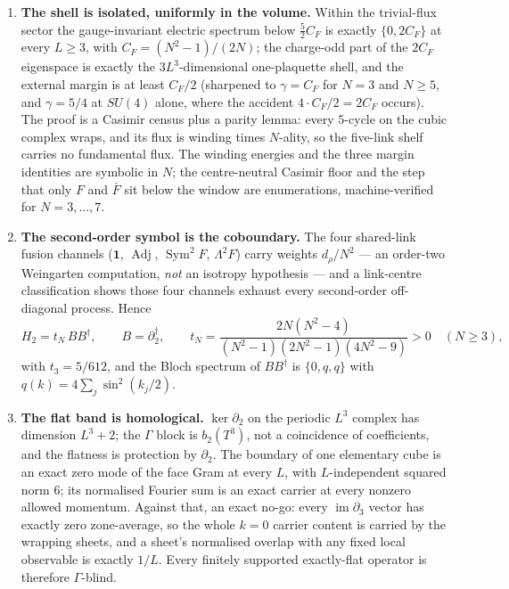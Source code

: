 \documentclass[11pt]{article}
\theoremstyle{definition}
\theoremstyle{remark}
\DeclareMathOperator{\adj}{Adj}
\DeclareMathOperator{\Sym}{Sym}
\newcommand{\CF}{C_F}
\newcommand{\dg}{^{\dagger}}
\newcommand{\chk}[1]{}
\begin{document}
\begin{enumerate}\itemsep3pt
\item \textbf{The shell is isolated, uniformly in the volume.} Within the
  trivial-flux sector the gauge-invariant electric spectrum below
  $\tfrac52\CF$ is exactly $\{0,2\CF\}$ at every $L\ge3$, with
  $\CF=(N^2-1)/(2N)$; the charge-odd part of the $2\CF$ eigenspace is exactly
  the $3L^3$-dimensional one-plaquette shell, and the external margin is at
  least $\CF/2$ (sharpened to $\gamma=\CF$ for $N=3$ and $N\ge5$, and
  $\gamma=5/4$ at $SU(4)$ alone, where the accident $4\cdot\CF/2=2\CF$ occurs).
  The proof is a Casimir census plus a parity lemma: every $5$-cycle on the
  cubic complex wraps, and its flux is winding times $N$-ality, so the
  five-link shelf carries no fundamental flux. The winding energies and the
  three margin identities are symbolic in $N$; the centre-neutral Casimir floor
  and the step that only $F$ and $\bar F$ sit below the window are enumerations,
  machine-verified for $N=3,\dots,7$.\chk{below 5 C\_F/2 the trivial-flux electric spectrum is exactly 0 and 2 C\_F}
\item \textbf{The second-order symbol is the coboundary.} The four shared-link
  fusion channels ($\mathbf1$, $\adj$, $\Sym^2F$, $\Lambda^2F$) carry weights
  $d_\rho/N^2$ --- an order-two Weingarten computation, \emph{not} an isotropy
  hypothesis --- and a link-centre classification shows those four channels
  exhaust every second-order off-diagonal process. Hence
  \begin{equation}\label{eq:t}
    H_2=t_N\,BB\dg,\qquad B=\partial_2\dg,\qquad
    t_N=\frac{2N(N^2-4)}{(N^2-1)(2N^2-1)(4N^2-9)}>0\quad(N\ge3),
  \end{equation}
  with $t_3=5/612$, and the Bloch spectrum of $BB\dg$ is $\{0,q,q\}$ with
  $q(k)=4\sum_{j}\sin^2(k_j/2)$.\chk{t\_2 = 0 and t\_3 = 5/612}
\item \textbf{The flat band is homological.} $\ker\partial_2$ on the periodic
  $L^3$ complex has dimension $L^3+2$; the $\Gamma$ block is $b_2(T^3)$, not a
  coincidence of coefficients, and the flatness is protection by $\partial_2$.
  The boundary of one elementary cube is an exact zero mode of the face Gram
  at every $L$, with $L$-independent squared norm $6$; its normalised Fourier
  sum is an exact carrier at every nonzero allowed momentum.
  Against that, an exact no-go: every $\operatorname{im}\partial_3$ vector has
  exactly zero zone-average, so the whole $k=0$ carrier content is carried by
  the wrapping sheets, and a sheet's normalised overlap with any fixed local
  observable is exactly $1/L$. Every finitely supported exactly-flat operator
  is therefore $\Gamma$-blind.\chk{im d3 is Gamma-blind, and the sheets carry the whole zone-average}
\end{enumerate}
\end{document}
